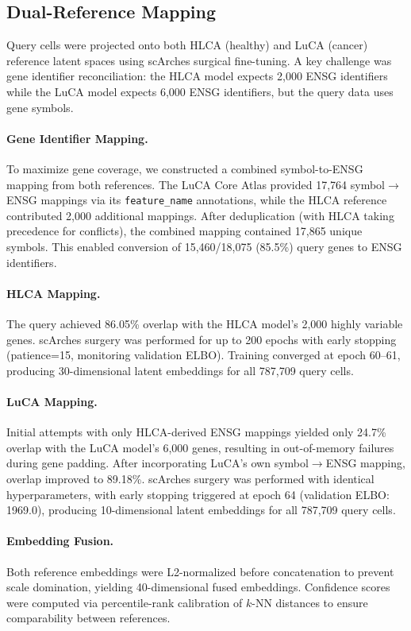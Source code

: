 \subsection{Dual-Reference Mapping}

Query cells were projected onto both HLCA (healthy) and LuCA (cancer) reference latent spaces using scArches surgical fine-tuning. A key challenge was gene identifier reconciliation: the HLCA model expects 2,000 ENSG identifiers while the LuCA model expects 6,000 ENSG identifiers, but the query data uses gene symbols.

\paragraph{Gene Identifier Mapping.} To maximize gene coverage, we constructed a combined symbol-to-ENSG mapping from both references. The LuCA Core Atlas provided 17,764 symbol$\to$ENSG mappings via its \texttt{feature\_name} annotations, while the HLCA reference contributed 2,000 additional mappings. After deduplication (with HLCA taking precedence for conflicts), the combined mapping contained 17,865 unique symbols. This enabled conversion of 15,460/18,075 (85.5\%) query genes to ENSG identifiers.

\paragraph{HLCA Mapping.} The query achieved 86.05\% overlap with the HLCA model's 2,000 highly variable genes. scArches surgery was performed for up to 200 epochs with early stopping (patience=15, monitoring validation ELBO). Training converged at epoch 60--61, producing 30-dimensional latent embeddings for all 787,709 query cells.

\paragraph{LuCA Mapping.} Initial attempts with only HLCA-derived ENSG mappings yielded only 24.7\% overlap with the LuCA model's 6,000 genes, resulting in out-of-memory failures during gene padding. After incorporating LuCA's own symbol$\to$ENSG mapping, overlap improved to 89.18\%. scArches surgery was performed with identical hyperparameters, with early stopping triggered at epoch 64 (validation ELBO: 1969.0), producing 10-dimensional latent embeddings for all 787,709 query cells.

\paragraph{Embedding Fusion.} Both reference embeddings were L2-normalized before concatenation to prevent scale domination, yielding 40-dimensional fused embeddings. Confidence scores were computed via percentile-rank calibration of $k$-NN distances to ensure comparability between references.

